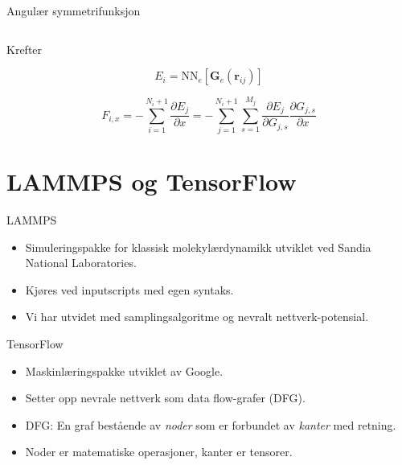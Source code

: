 \documentclass{beamer}
\begin{document}
\begin{frame}{Angulær symmetrifunksjon}
\begin{columns}
\begin{column}{0.5\linewidth}
  \end{column}
\end{columns}

\end{frame}


\begin{frame}{Krefter}

\begin{equation*}
 E_i = \mathrm{NN}_e[\mathbf{G}_e(\mathbf{r}_{ij})]
\end{equation*}

\begin{equation*}
  F_{i,x} = -\sum_{i=1}^{N_i+1}\frac{\partial E_j}{\partial x} = 
 -\sum_{j=1}^{N_i+1}\sum_{s=1}^{M_j}\frac{\partial E_j}{\partial G_{j,s}}\frac{\partial G_{j,s}}{\partial x}
\end{equation*}

\end{frame}


\section{LAMMPS og TensorFlow}


\begin{frame}

\begin{block}{LAMMPS}
 \begin{itemize}
  \item Simuleringspakke for klassisk molekylærdynamikk utviklet ved Sandia National Laboratories. 
  \item Kjøres ved inputscripts med egen syntaks. 
  \item Vi har utvidet med samplingsalgoritme og nevralt nettverk-potensial.
 \end{itemize}
\end{block}

\end{frame}


\begin{frame}

\begin{block}{TensorFlow}
 \begin{itemize}
  \item Maskinlæringspakke utviklet av Google. 
  \item Setter opp nevrale nettverk som data flow-grafer (DFG). 
  \item DFG: En graf bestående av \textit{noder} som er forbundet av \textit{kanter} med retning. 
  \item Noder er matematiske operasjoner, kanter er tensorer. 
 \end{itemize}
\end{block}

\end{frame}
\end{document}
